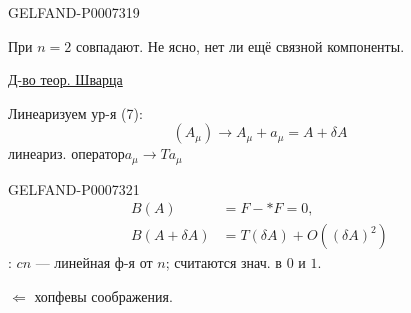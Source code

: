 \begin{GelfandAdjacentEvidence}{GELFAND-P000731}{9}


При \(n=2\) совпадают. Не ясно, нет ли ещё связной компоненты.

\underline{Д-во теор. Шварца}

Линеаризуем ур-я (7):
\[
(A_\mu)\longrightarrow A_\mu+a_\mu=A+\delta A
\]
линеариз. оператор\quad \(a_\mu\longrightarrow Ta_\mu\)
\end{GelfandAdjacentEvidence}



\begin{GelfandAdjacentEvidence}{GELFAND-P000732}{1}
\[
\begin{aligned}
B(A)&=F-{*}F=0,\\
B(A+\delta A)&=T(\delta A)+O((\delta A)^2)
\end{aligned}
\]
: \(cn\) --- линейная ф-я от \(n\); считаются знач. в \(0\) и \(1\).

\quad [зачёркнуто]\quad \(\Leftarrow\) хопфевы соображения.
\end{GelfandAdjacentEvidence}
